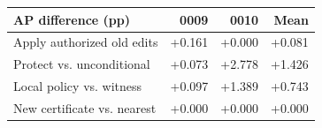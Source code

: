 \begin{tabular}{@{}lrrr@{}}
\toprule
AP difference (pp) & 0009 & 0010 & Mean \\
\midrule
Apply authorized old edits & +0.161 & +0.000 & +0.081 \\
Protect vs. unconditional & +0.073 & +2.778 & +1.426 \\
Local policy vs. witness & +0.097 & +1.389 & +0.743 \\
New certificate vs. nearest & +0.000 & +0.000 & +0.000 \\
\bottomrule
\end{tabular}
